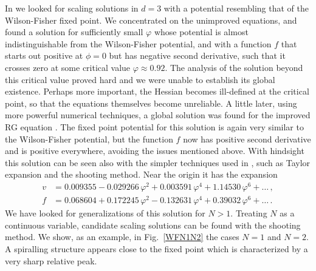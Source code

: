 \documentclass[11pt]{book} %
\begin{document}
In \cite{Percacci:2015wwa} we looked for scaling solutions in $d=3$
with a potential resembling that of the Wilson-Fisher fixed point.
We concentrated on the unimproved equations,
and found a solution for sufficiently small $\varphi$
whose potential is almost indistinguishable from the
Wilson-Fisher potential, and with a function $f$
that starts out positive at $\phi=0$ but has negative
second derivative, such that it crosses zero at
some critical value $\varphi\approx 0.92$.
The analysis of the solution beyond this critical value
proved hard and we were unable to establish its global existence.
Perhaps more important, the Hessian becomes ill-defined at the
critical point, so that the equations themselves become unreliable.
A little later, using more powerful numerical techniques,
a global solution was found for the improved RG equation \cite{Borchardt:2015rxa}.
The fixed point potential for this solution is again
very similar to the Wilson-Fisher potential,
but the function $f$ now has positive second derivative
and is positive everywhere, avoiding the issues mentioned above.
With hindsight this solution can be seen also with the
simpler techniques used in \cite{Percacci:2015wwa}, such as
Taylor expansion and the shooting method.
Near the origin it has the expansion
\begin{align}
v &= 0.009355 - 0.029266 \, \varphi ^2 + 0.003591 \, \varphi ^4 + 1.14530 \, \varphi ^6 + \dots \,, \nonumber \\
f &= 0.068604 + 0.172245 \, \varphi ^2 - 0.132631 \, \varphi ^4 + 0.39032 \, \varphi ^6 + \dots \,. \nonumber
\end{align}
We have looked for generalizations of this solution for $N>1$.
Treating $N$ as a continuous variable, candidate scaling solutions
can be found with the shooting method.
We show, as an example, in Fig.~\ref{WFN1N2} the cases $N=1$ and $N=2$.
A spiralling structure appears close to the fixed point which is characterized by a very sharp relative peak.
\end{document}
